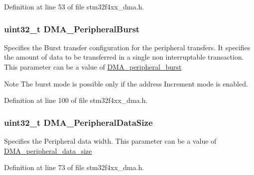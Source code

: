 Definition at line 53 of file stm32f4xx\-\_\-dma.\-h.

\hypertarget{struct_d_m_a___init_type_def_a6772e281310a3e93781364c723984138}{
\subsubsection[{D\-M\-A\-\_\-\-Peripheral\-Burst}]{\setlength{\rightskip}{0pt plus 5cm}uint32\-\_\-t D\-M\-A\-\_\-\-Peripheral\-Burst}}\label{struct_d_m_a___init_type_def_a6772e281310a3e93781364c723984138}
Specifies the Burst transfer configuration for the peripheral transfers. It specifies the amount of data to be transferred in a single non interruptable transaction. This parameter can be a value of \hyperlink{group___d_m_a__peripheral__burst}{D\-M\-A\-\_\-peripheral\-\_\-burst} \begin{DoxyNote}{Note}
The burst mode is possible only if the address Increment mode is enabled. 
\end{DoxyNote}


Definition at line 100 of file stm32f4xx\-\_\-dma.\-h.

\hypertarget{struct_d_m_a___init_type_def_a61bf939d8657d44a9beb1daa91c14668}{
\subsubsection[{D\-M\-A\-\_\-\-Peripheral\-Data\-Size}]{\setlength{\rightskip}{0pt plus 5cm}uint32\-\_\-t D\-M\-A\-\_\-\-Peripheral\-Data\-Size}}\label{struct_d_m_a___init_type_def_a61bf939d8657d44a9beb1daa91c14668}
Specifies the Peripheral data width. This parameter can be a value of \hyperlink{group___d_m_a__peripheral__data__size}{D\-M\-A\-\_\-peripheral\-\_\-data\-\_\-size} 

Definition at line 73 of file stm32f4xx\-\_\-dma.\-h.

